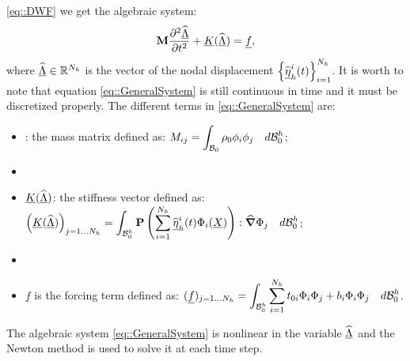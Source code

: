 \eqref{eq::DWF} we get the algebraic system:
\begin{equation} \textbf{M}\frac{\partial^2\widehat{\underline{\Lambda}}}{\partial t^2}+\underline{K}(\widehat{\underline{\Lambda}})
= \underline{f},
  \label{eq::GeneralSystem}
\end{equation} where $\widehat{\underline{\Lambda}} \in \mathbb{R}^{N_h}$ is the vector of the nodal
displacement $\left\{\widehat{\underline{\eta}}_h^i(t)\right\}_{i=1}^{N_h}$. It is worth
to note that equation \eqref{eq::GeneralSystem} is still continuous in
time and it must be discretized properly. The different terms in
\eqref{eq::GeneralSystem} are:
\begin{itemize}
  \item \mass: the mass matrix defined as: $\displaystyle
M_{ij}=\int_{\mathcal{B}_0}\rho_0\phi_i\phi_j\quad d\mathcal{B}_0^h$;
  \item[]
  \item $\underline{K}(\widehat{\underline{\Lambda}})$: the stiffness vector defined as: $\displaystyle
\left(\underline{K}(\widehat{\underline{\Lambda}})\right)_{j=1\ldots
N_h}=\int_{\mathcal{B}_0^h}\textbf{P}\left(\sum_{i=1}^{N_h}\widehat{\underline{\eta}}_h^i(t)\Phi_i(\underline{X})\right):\widehat{\boldsymbol{\nabla}}\Phi_j\quad
d \mathcal{B}_0^h$;
  \item[]
  \item $\underline{f}$ is the forcing term defined as: $\displaystyle
(\underline{f})_{j=1\ldots
N_h}=\int_{\mathcal{B}_0^h}\sum_{i=1}^{N_h}t_{0i}\Phi_i\Phi_j+b_i\Phi_i\Phi_j\quad
d\mathcal{B}_0^h$.
\end{itemize} The algebraic system \eqref{eq::GeneralSystem} is
nonlinear in the variable $\widehat{\underline{\Lambda}}$ and the Newton method is used to
solve it at each time step.

